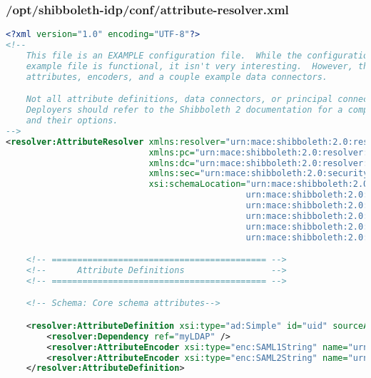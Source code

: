 \subsubsection{/opt/shibboleth-idp/conf/attribute-resolver.xml}
\begin{lstlisting}[language=xml]
<?xml version="1.0" encoding="UTF-8"?>
<!--
    This file is an EXAMPLE configuration file.  While the configuration presented in this
    example file is functional, it isn't very interesting.  However, there are lots of example
    attributes, encoders, and a couple example data connectors.

    Not all attribute definitions, data connectors, or principal connectors are demonstrated.
    Deployers should refer to the Shibboleth 2 documentation for a complete list of components
    and their options.
-->
<resolver:AttributeResolver xmlns:resolver="urn:mace:shibboleth:2.0:resolver" xmlns:xsi="http://www.w3.org/2001/XMLSchema-instance"
                            xmlns:pc="urn:mace:shibboleth:2.0:resolver:pc" xmlns:ad="urn:mace:shibboleth:2.0:resolver:ad"
                            xmlns:dc="urn:mace:shibboleth:2.0:resolver:dc" xmlns:enc="urn:mace:shibboleth:2.0:attribute:encoder"
                            xmlns:sec="urn:mace:shibboleth:2.0:security"
                            xsi:schemaLocation="urn:mace:shibboleth:2.0:resolver classpath:/schema/shibboleth-2.0-attribute-resolver.xsd
                                               urn:mace:shibboleth:2.0:resolver:pc classpath:/schema/shibboleth-2.0-attribute-resolver-pc.xsd
                                               urn:mace:shibboleth:2.0:resolver:ad classpath:/schema/shibboleth-2.0-attribute-resolver-ad.xsd
                                               urn:mace:shibboleth:2.0:resolver:dc classpath:/schema/shibboleth-2.0-attribute-resolver-dc.xsd
                                               urn:mace:shibboleth:2.0:attribute:encoder classpath:/schema/shibboleth-2.0-attribute-encoder.xsd
                                               urn:mace:shibboleth:2.0:security classpath:/schema/shibboleth-2.0-security.xsd">

    <!-- ========================================== -->
    <!--      Attribute Definitions                 -->
    <!-- ========================================== -->

    <!-- Schema: Core schema attributes-->

    <resolver:AttributeDefinition xsi:type="ad:Simple" id="uid" sourceAttributeID="uid">
        <resolver:Dependency ref="myLDAP" />
        <resolver:AttributeEncoder xsi:type="enc:SAML1String" name="urn:mace:dir:attribute-def:uid" />
        <resolver:AttributeEncoder xsi:type="enc:SAML2String" name="urn:oid:0.9.2342.19200300.100.1.1" friendlyName="uid" />
    </resolver:AttributeDefinition>


\end{lstlisting}
